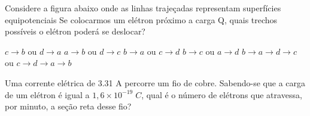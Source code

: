 \documentclass[12pt, addpoints]{exam}
\begin{document}
    \begin{questions}
\begin{multicols*}{2}
\question Considere a figura abaixo onde as linhas trajeçadas representam superfícies equipotenciais Se colocarmos um elétron próximo a carga Q, quais trechos possíveis o elétron poderá se deslocar?
        
        \begin{center}
            \begin{minipage}[c]{0.5\linewidth}
            \end{minipage}
        \end{center}
        
        

\begin{choices}
\choice $c\rightarrow b$ ou $d\rightarrow a$ 
\choice $a\rightarrow b$ ou $d\rightarrow c$ 
\choice $b\rightarrow a$ ou $c\rightarrow d$ 
\choice $b\rightarrow c$ ou $a\rightarrow d$ 
\choice $b\rightarrow a\rightarrow d\rightarrow c$ ou $c\rightarrow d\rightarrow a\rightarrow b$ 
\end{choices}
\question Uma corrente elétrica de    3.31 A percorre um ﬁo de cobre. Sabendo-se que a carga de um elétron é igual a $1,6\times 10^{-19}\;C$, qual é o número de elétrons que atravessa, por minuto, a seção reta desse ﬁo?


\end{multicols*}
\end{questions}
\end{document}
